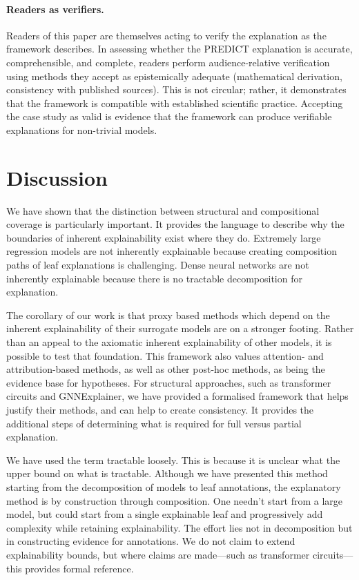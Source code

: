 \documentclass{article}
\begin{document}
\paragraph{Readers as verifiers.} Readers of this paper are themselves acting to verify the explanation as the framework describes. In assessing whether the PREDICT explanation is accurate, comprehensible, and complete, readers perform audience-relative verification using methods they accept as epistemically adequate (mathematical derivation, consistency with published sources). This is not circular; rather, it demonstrates that the framework is compatible with established scientific practice. Accepting the case study as valid is evidence that the framework can produce verifiable explanations for non-trivial models.

\section{Discussion}

We have shown that the distinction between structural and compositional coverage is particularly important. It provides the language to describe why the boundaries of inherent explainability exist where they do. Extremely large regression models are not inherently explainable because creating composition paths of leaf explanations is challenging. Dense neural networks are not inherently explainable because there is no tractable decomposition for explanation.

The corollary of our work is that proxy based methods which depend on the inherent explainability of their surrogate models are on a stronger footing. Rather than an appeal to the axiomatic inherent explainability of other models, it is possible to test that foundation. This framework also values attention- and attribution-based methods, as well as other post-hoc methods, as being the evidence base for hypotheses. For structural approaches, such as transformer circuits and GNNExplainer, we have provided a formalised framework that helps justify their methods, and can help to create consistency. It provides the additional steps of determining what is required for full versus partial explanation. 

We have used the term tractable loosely. This is because it is unclear what the upper bound on what is tractable. Although we have presented this method starting from the decomposition of models to leaf annotations, the explanatory method is by construction through composition. One needn't start from a large model, but could start from a single explainable leaf and progressively add complexity while retaining explainability. The effort lies not in decomposition but in constructing evidence for annotations. We do not claim to extend explainability bounds, but where claims are made—such as transformer circuits—this provides formal reference.
\end{document}
